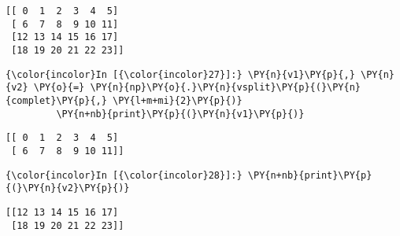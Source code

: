     \begin{Verbatim}[commandchars=\\\{\},frame=single,framerule=0.3mm,rulecolor=\color{cellframecolor}]
[[ 0  1  2  3  4  5]
 [ 6  7  8  9 10 11]
 [12 13 14 15 16 17]
 [18 19 20 21 22 23]]
\end{Verbatim}

    \begin{Verbatim}[commandchars=\\\{\},frame=single,framerule=0.3mm,rulecolor=\color{cellframecolor}]
{\color{incolor}In [{\color{incolor}27}]:} \PY{n}{v1}\PY{p}{,} \PY{n}{v2} \PY{o}{=} \PY{n}{np}\PY{o}{.}\PY{n}{vsplit}\PY{p}{(}\PY{n}{complet}\PY{p}{,} \PY{l+m+mi}{2}\PY{p}{)}
         \PY{n+nb}{print}\PY{p}{(}\PY{n}{v1}\PY{p}{)}
\end{Verbatim}


    \begin{Verbatim}[commandchars=\\\{\},frame=single,framerule=0.3mm,rulecolor=\color{cellframecolor}]
[[ 0  1  2  3  4  5]
 [ 6  7  8  9 10 11]]
\end{Verbatim}

    \begin{Verbatim}[commandchars=\\\{\},frame=single,framerule=0.3mm,rulecolor=\color{cellframecolor}]
{\color{incolor}In [{\color{incolor}28}]:} \PY{n+nb}{print}\PY{p}{(}\PY{n}{v2}\PY{p}{)}
\end{Verbatim}


    \begin{Verbatim}[commandchars=\\\{\},frame=single,framerule=0.3mm,rulecolor=\color{cellframecolor}]
[[12 13 14 15 16 17]
 [18 19 20 21 22 23]]
\end{Verbatim}


    
    
    
